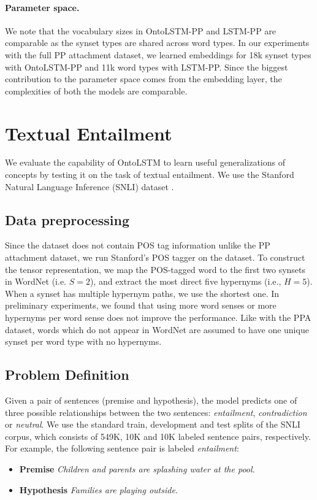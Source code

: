 \paragraph{Parameter space.} We note that the vocabulary sizes in OntoLSTM-PP and LSTM-PP are comparable as the synset types are shared across word types. 
In our experiments with the full PP attachment dataset, we learned embeddings for 18k synset types with OntoLSTM-PP and 11k word types with LSTM-PP. Since the biggest contribution to the parameter space comes from the embedding layer,
the complexities of both the models are comparable.

\section{Textual Entailment}
\label{sec:ontolstm_snli}
We evaluate the capability of OntoLSTM to learn useful generalizations of concepts by testing it on
the task of textual entailment. We use the Stanford Natural Language Inference (SNLI) dataset \citep{bowman:15}.

\subsection{Data preprocessing} Since the dataset does not contain POS tag information unlike the PP attachment dataset,
we run Stanford's POS tagger \citep{toutanova:03} on the dataset.
To construct the tensor representation, we map the POS-tagged word to the first 
two synsets in WordNet (i.e. $S=2$), and extract the most direct five hypernyms 
(i.e., $H=5$). When a synset has multiple hypernym paths, we use the shortest 
one. In preliminary experiments, we found that using more word senses or more 
hypernyms per word sense does not improve the performance.
Like with the PPA dataset, words which do not appear in WordNet are assumed to
have one unique synset per word type with no hypernyms.

\subsection{Problem Definition}
Given a pair of sentences (premise and hypothesis), the model predicts one of 
three possible relationships between the two sentences: \textit{entailment}, 
\textit{contradiction} or \textit{neutral}.
We use the standard train, development and test splits of the SNLI corpus, which 
consists of 549K, 10K and 10K labeled sentence pairs, respectively.
For example, the following sentence pair is labeled \textit{entailment}:
 \begin{itemize}
  \item \textbf{Premise} \textit{Children and parents are splashing water at the 
pool.}
  \item \textbf{Hypothesis} \textit{Families are playing outside.}
 \end{itemize}
 
